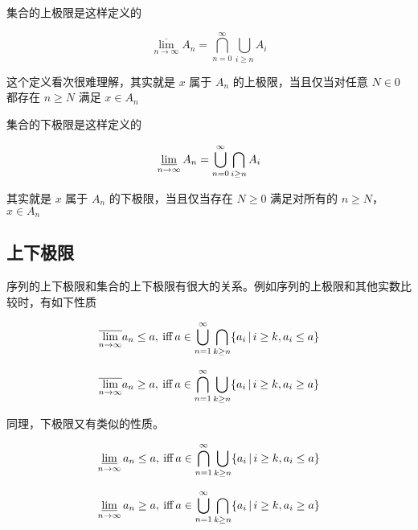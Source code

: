 集合的上极限是这样定义的

\[
\overline{\lim_{n \to \infty}}A_n  = \bigcap_{n=0}^{\infty}\bigcup_{i \ge n}A_i
\]

这个定义看次很难理解，其实就是 $x$ 属于 $A_n$ 的上极限，当且仅当对任意 $N \in 0$ 都存在 $n \ge N$ 满足 $x \in A_n$


集合的下极限是这样定义的

\[
\varliminf_{n \to \infty}A_n  = \bigcup_{n=0}^{\infty}\bigcap_{i \ge n}A_i
\]

其实就是 $x$ 属于 $A_n$ 的下极限，当且仅当存在 $N  \ge 0$ 满足对所有的 $n \ge N$，$x \in A_n$

\subsection{上下极限}

序列的上下极限和集合的上下极限有很大的关系。例如序列的上极限和其他实数比较时，有如下性质

\[
\overline{\lim_{n \to \infty}} a_n \le a ,\:\text{iff}\: a \in \bigcup_{n=1}^{\infty} \bigcap_{k \ge n} \{ a_i \,\vert\, i \ge k, a_i \le a \} 
\]


\[
\overline{\lim_{n \to \infty}} a_n \ge a ,\:\text{iff}\: a \in \bigcap_{n=1}^{\infty} \bigcup_{k \ge n} \{ a_i \,\vert\, i \ge k, a_i \ge a \} 
\]

同理，下极限又有类似的性质。

\[
\varliminf_{n \to \infty} a_n \le a ,\:\text{iff}\: a \in \bigcap_{n=1}^{\infty} \bigcup_{k \ge n} \{ a_i \,\vert\, i \ge k, a_i \le a \} 
\]


\[
\varliminf_{n \to \infty} a_n \ge a ,\:\text{iff}\: a \in \bigcup_{n=1}^{\infty} \bigcap_{k \ge n} \{ a_i \,\vert\, i \ge k, a_i \ge a \} 
\]



